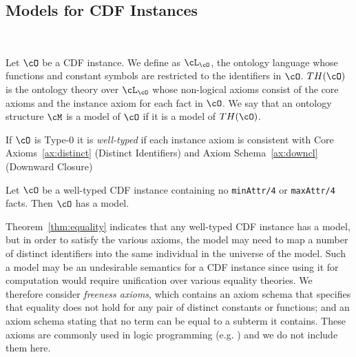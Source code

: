 \subsection{Models for CDF Instances}~\label{sec:model}
\begin{definition} \label{def:ont-th}
Let $\cO$ be a CDF instance.  We define as $\cL_{\cO}$, the ontology
language whose functions and constant symbols are restricted to the
identifiers in $\cO$.  $TH(\cO)$ is the ontology theory over
$\cL_{\cO}$ whose non-logical axioms consist of the core axioms and
the instance axiom for each fact in $\cO$.
We say that an ontology structure $\cM$ is a model of $\cO$ if it is a
model of $TH(\cO)$.

If $\cO$ is Type-0 it is {\em well-typed} if each instance axiom is
consistent with Core Axioms~\ref{ax:distinct} (Distinct Identifiers)
and Axiom Schema~\ref{ax:downcl} (Downward Closure)
\end{definition}

\begin{theorem} \label{thm:equality}
Let $\cO$ be a well-typed CDF instance containing no {\tt minAttr/4}
or {\tt maxAttr/4} facts.  Then $\cO$ has a model.
\end{theorem}


Theorem~\ref{thm:equality} indicates that any well-typed CDF instance
has a model, but in order to satisfy the various axioms, the model may
need to map a number of distinct identifiers into the same individual
in the universe of the model.  Such a model may be an undesirable
semantics for a CDF instance since using it for computation would
require unification over various equality theories.  We therefore
consider {\em freeness axioms}, which contains an axiom schema that
specifies that equality does not hold for any pair of distinct
constants or functions; and an axiom schema stating that no term can
be equal to a subterm it contains.  These axioms are commonly used in
logic programming (e.g. \cite{Lloy84}) and we do not include them
here.

